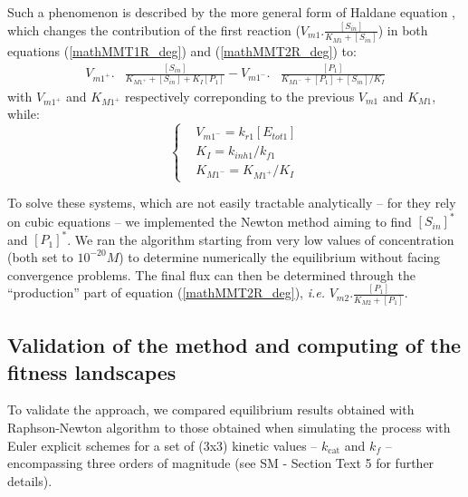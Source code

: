 \documentclass[11pt,onecolumn]{article}
\begin{document}
Such a phenomenon is described by the more general form of Haldane equation \citep{Haldane30,Cornish-Bowden79a}, which changes the contribution of the first reaction ($V_{m1}.\frac{[S_{in}]}{K_{M1}+[S_{in}]}$) in both equations (\ref{mathMMT1R_deg}) and (\ref{mathMMT2R_deg}) to:
\footnotesize
\begin{equation*}
		\begin{aligned}
		V_{m1^{+}}.&\frac{[S_{in}]}{K_{M1^{+}}+[S_{in}]+K_I [P_1]}-V_{m1^{-}}.&\frac{[P_1]}{K_{M1^{-}}+[P_1]+[S_{in}]/K_I}
		\end{aligned}
		\label{mathMMT1R_rev}
\end{equation*}
\normalsize
with $V_{m1^{+}}$ and $K_{M1^{+}}$ respectively correponding to the previous $V_{m1}$ and $K_{M1}$, while:
\small
\begin{equation*}
  \left\{
      \begin{aligned}
		&V_{m1^{-}}=k_{r1}[E_{tot1}]\\
		&K_I=k_{inh1}/k_{f1}\\
		&K_{M1^{-}}=K_{M1^{+}}/K_I
      \end{aligned}
    \right.
\end{equation*}
\normalsize

To solve these systems, which are not easily tractable analytically -- for they rely on cubic equations -- we implemented the Newton method \citep{Atkinson89} aiming to find $[S_{in}]^*$ and $[P_1]^*$. We ran the algorithm starting from very low values of concentration (both set to $10^{-20}M$) to determine numerically the equilibrium without facing convergence problems. The final flux can then be determined through the ``production'' part of equation (\ref{mathMMT2R_deg}), \textit{i.e.} $V_{m2}.\frac{[P_1]}{K_{M2}+[P_1]}$.

\subsection{Validation of the method and computing of the fitness landscapes}

To validate the approach, we compared equilibrium results obtained with Raphson-Newton algorithm to those obtained when simulating the process with Euler explicit schemes for a set of (3x3) kinetic values -- $k_\text{cat}$ and $k_f$ -- encompassing three orders of magnitude (see SM - Section Text 5 for further details).
\end{document}
